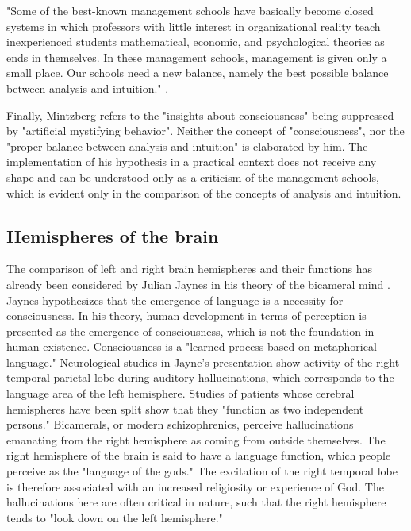 \documentclass[a4paper,12pt]{article}
\begin{document}
"Some of the best-known management schools have basically become closed
systems in which professors with little interest in organizational reality
teach inexperienced students mathematical, economic, and psychological
theories as ends in themselves. In these management schools, management is
given only a small place. Our schools need a new balance, namely the best
possible balance between analysis and intuition." \cite[p. 68]{Mintzberg}.

Finally, Mintzberg refers to the "insights about consciousness"
\cite[p. 68]{Mintzberg} being suppressed by "artificial mystifying behavior".
Neither the concept of "consciousness", nor the "proper balance between
analysis and intuition" is elaborated by him. The implementation of his
hypothesis in a practical context does not receive any shape and can be
understood only as a criticism of the management schools, which is evident
only in the comparison of the concepts of analysis and intuition.

\subsection{Hemispheres of the brain}

The comparison of left and right brain hemispheres and their functions has
already been considered by Julian Jaynes in his theory of the bicameral mind
\cite{Jaynes}. Jaynes hypothesizes that the emergence of language is a
necessity for consciousness. In his theory, human development in terms of
perception is presented as the emergence of consciousness, which is not the
foundation in human existence. Consciousness is a "learned process based on
metaphorical language." Neurological studies in Jayne's presentation show
activity of the right temporal-parietal lobe during auditory hallucinations,
which corresponds to the language area of the left hemisphere. Studies of
patients whose cerebral hemispheres have been split show that they "function
as two independent persons." Bicamerals, or modern schizophrenics, perceive
hallucinations emanating from the right hemisphere as coming from outside
themselves. The right hemisphere of the brain is said to have a language
function, which people perceive as the "language of the gods." The excitation
of the right temporal lobe is therefore associated with an increased
religiosity or experience of God. The hallucinations here are often critical
in nature, such that the right hemisphere tends to "look down on the left
hemisphere."
\end{document}
